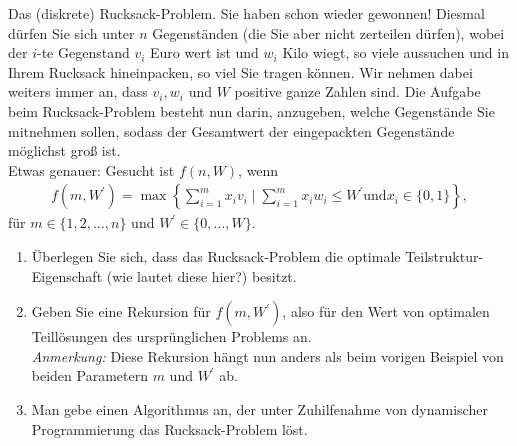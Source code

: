 
\begin{exercise}

Das (diskrete) Rucksack-Problem. Sie haben schon wieder gewonnen! Diesmal dürfen
Sie sich unter $n$ Gegenständen (die Sie aber nicht zerteilen dürfen), wobei der
$i$-te Gegenstand $v_i$ Euro wert ist und $w_i$ Kilo wiegt, so viele aussuchen und
in Ihrem Rucksack hineinpacken, so viel Sie tragen können. Wir nehmen dabei weiters
immer an, dass $v_i,w_i$ und $W$ positive ganze Zahlen sind. Die Aufgabe beim
\glqq Rucksack-Problem \grqq besteht nun darin, anzugeben, welche Gegenstände
Sie mitnehmen sollen, sodass der Gesamtwert der eingepackten Gegenstände möglichst groß ist. \\
Etwas genauer: Gesucht ist $f(n,W)$, wenn
\begin{align*}
  f(m, W^{\prime}) = \max\left\{\sum_{i=1}^m x_iv_i \mid \sum_{i=1}^m x_iw_i \leq
  W^{\prime} \text{und} x_i \in \{0,1\}\right\},
\end{align*}
für $m \in \{1,2,\dots,n\}$ und $W^{\prime} \in \{0,\dots,W\}$.
\begin{enumerate}[label = \alph*)]
  \item Überlegen Sie sich, dass das Rucksack-Problem die optimale Teilstruktur-Eigenschaft
  (wie lautet diese hier?) besitzt.
  \item Geben Sie eine Rekursion für $f(m,W^{\prime})$, also für den Wert von
  optimalen Teillösungen des ursprünglichen Problems an. \\
  \textit{Anmerkung:} Diese Rekursion hängt nun anders als beim vorigen Beispiel von beiden Parametern $m$ und $W^{\prime}$
  ab.
  \item Man gebe einen Algorithmus an, der unter Zuhilfenahme von dynamischer Programmierung
  das Rucksack-Problem löst.
\end{enumerate}
\end{exercise}



\begin{solution}

\phantom{}

\end{solution}
